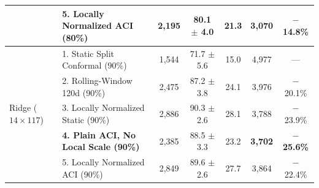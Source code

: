 \documentclass[5p,twocolumn,authoryear]{elsarticle}
\begin{document}
\begin{table}[t]
{\begin{tabular}{llccccc}
 & 5. Locally Normalized ACI (80\%) & 2,195 & 80.1 $\pm$ 4.0 & 21.3 & 3,070 & $-$14.8\% \\
\midrule
\multirow{5}{*}{Ridge ($14 \times 117$)} & 1. Static Split Conformal (90\%) & 1,544 & 71.7 $\pm$ 5.6 & 15.0 & 4,977 & --- \\
 & 2. Rolling-Window 120d (90\%) & 2,475 & 87.2 $\pm$ 3.8 & 24.1 & 3,976 & $-$20.1\% \\
 & 3. Locally Normalized Static (90\%) & 2,886 & 90.3 $\pm$ 2.6 & 28.1 & 3,788 & $-$23.9\% \\
 & \textbf{4. Plain ACI, No Local Scale (90\%)} & 2,385 & 88.5 $\pm$ 3.3 & 23.2 & \textbf{3,702} & \textbf{$-$25.6\%} \\
 & 5. Locally Normalized ACI (90\%) & 2,849 & 89.6 $\pm$ 2.6 & 27.7 & 3,864 & $-$22.4\% \\
\bottomrule
\end{tabular}%
}
\end{table}
\end{document}
